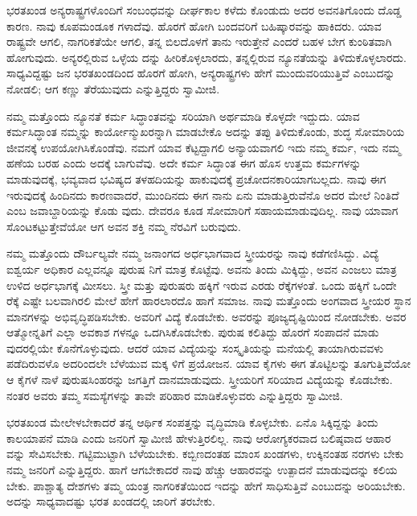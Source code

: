 ಭರತಖಂಡ ಅನ್ಯರಾಷ್ಟ್ರಗಳೊಂದಿಗೆ ಸಂಬಂಧವನ್ನು ದೀರ್ಘಕಾಲ ಕಳೆದು ಕೊಂಡುದು ಅದರ ಅವನತಿಗೊಂದು ದೊಡ್ಡ ಕಾರಣ. ನಾವು ಕೂಪಮಂಡೂಕ ಗಳಾದೆವು. ಹೊರಗೆ ಹೋಗಿ ಬಂದವರಿಗೆ ಬಹಿಷ್ಕಾರವನ್ನು ಹಾಕಿದರು. ಯಾವ ರಾಷ್ಟ್ರವೇ ಆಗಲಿ, ನಾಗರಿಕತೆಯೇ ಆಗಲಿ, ತನ್ನ ಬಿಲದೊಳಗೆ ತಾನು ಇರುತ್ತೇನೆ ಎಂದರೆ ಬಹಳ ಬೇಗ ಕುಂಠಿತವಾಗಿ ಹೋಗುವುದು. ಅನ್ಯರಲ್ಲಿರುವ ಒಳ್ಳೆಯ ದನ್ನು ಹೀರಿಕೊಳ್ಳಲಾರದು, ತನ್ನಲ್ಲಿರುವ ನ್ಯೂನತೆಯನ್ನು ತಿಳಿದುಕೊಳ್ಳಲಾರದು. ಸಾಧ್ಯವಿದ್ದಷ್ಟು ಜನ ಭರತಖಂಡದಿಂದ ಹೊರಗೆ ಹೋಗಿ, ಅನ್ಯರಾಷ್ಟ್ರಗಳು ಹೇಗೆ ಮುಂದುವರಿಯುತ್ತಿವೆ ಎಂಬುದನ್ನು ನೋಡಲಿ; ಆಗ ಕಣ್ಣು ತೆರೆಯುವುದು ಎನ್ನುತ್ತಿದ್ದರು ಸ್ವಾಮೀಜಿ.

ನಮ್ಮ ಮತ್ತೊಂದು ನ್ಯೂನತೆ ಕರ್ಮ ಸಿದ್ಧಾಂತವನ್ನು ಸರಿಯಾಗಿ ಅರ್ಥಮಾಡಿ ಕೊಳ್ಳದೇ ಇದ್ದುದು. ಯಾವ ಕರ್ಮಸಿದ್ಧಾಂತ ನಮ್ಮನ್ನು ಕಾರ್ಯೋನ್ಮುಖರನ್ನಾಗಿ ಮಾಡಬೇಕೊ ಅದನ್ನು ತಪ್ಪು ತಿಳಿದುಕೊಂಡು, ಶುದ್ಧ ಸೋಮಾರಿಯ ಜೀವನಕ್ಕೆ ಉಪಯೋಗಿಸಿಕೊಂಡೆವು. ನಮಗೆ ಯಾವ ಕೆಟ್ಟದ್ದಾಗಲಿ ಅನ್ಯಾಯವಾಗಲಿ ಇದು ನಮ್ಮ ಕರ್ಮ, ಇದು ನಮ್ಮ ಹಣೆಯ ಬರಹ ಎಂದು ಅದಕ್ಕೆ ಬಾಗುವೆವು. ಅದೇ ಕರ್ಮ ಸಿದ್ಧಾಂತ ಈಗ ಹೊಸ ಉತ್ತಮ ಕರ್ಮಗಳನ್ನು ಮಾಡುವುದಕ್ಕೆ, ಭವ್ಯವಾದ ಭವಿಷ್ಯದ ತಳಹದಿಯನ್ನು ಹಾಕುವುದಕ್ಕೆ ಪ್ರಚೋದನಕಾರಿಯಾಗಬಲ್ಲದು. ನಾವು ಈಗ ಇರುವುದಕ್ಕೆ ಹಿಂದಿನದು ಕಾರಣವಾದರೆ, ಮುಂದಿನದು ಈಗ ನಾನು ಏನು ಮಾಡುತ್ತಿರುವೆನೊ ಅದರ ಮೇಲೆ ನಿಂತಿದೆ ಎಂಬ ಜವಾಬ್ದಾರಿಯನ್ನು ಕೊಡು ವುದು. ದೇವರೂ ಕೂಡ ಸೋಮಾರಿಗೆ ಸಹಾಯಮಾಡುವುದಿಲ್ಲ. ನಾವು ಯಾವಾಗ ಸೊಂಟಕಟ್ಟುತ್ತೇವೆಯೋ ಆಗ ಅವನ ಶಕ್ತಿ ನಮ್ಮ ನೆರವಿಗೆ ಬರುವುದು.

ನಮ್ಮ ಮತ್ತೊಂದು ದೌರ್ಬಲ್ಯವೇ ನಮ್ಮ ಜನಾಂಗದ ಅರ್ಧಭಾಗವಾದ ಸ್ತ್ರೀಯರನ್ನು ನಾವು ಕಡೆಗಣಿಸಿದ್ದು. ವಿದ್ಯೆ ಐಶ್ವರ್ಯ ಅಧಿಕಾರ ಎಲ್ಲವನ್ನೂ ಪುರುಷ ನಿಗೆ ಮಾತ್ರ ಕೊಟ್ಟೆವು. ಅವನು ತಿಂದು ಮಿಕ್ಕಿದ್ದು, ಅವನ ಎಂಜಲು ಮಾತ್ರ ಉಳಿದ ಅರ್ಧಭಾಗಕ್ಕೆ ಮೀಸಲು. ಸ್ತ್ರೀ ಮತ್ತು ಪುರುಷರು ಹಕ್ಕಿಗೆ ಇರುವ ಎರಡು ರೆಕ್ಕೆಗಳಂತೆ. ಒಂದು ಹಕ್ಕಿಗೆ ಒಂದೇ ರೆಕ್ಕೆ ಎಷ್ಟೇ ಬಲವಾಗಿರಲಿ ಮೇಲೆ ಹೇಗೆ ಹಾರಲಾರದೊ ಹಾಗೆ ಸಮಾಜ. ನಾವು ಮತ್ತೊಂದು ಅಂಗವಾದ ಸ್ತ್ರೀಯರ ಸ್ಥಾನ ಮಾನಗಳನ್ನು ಅಭಿವೃದ್ಧಿಪಡಿಸಬೇಕು. ಅವರಿಗೆ ವಿದ್ಯೆ ಕೊಡಬೇಕು. ಅವರನ್ನು ಪೂಜ್ಯದೃಷ್ಟಿಯಿಂದ ನೋಡಬೇಕು. ಅವರ ಆತ್ಮೋನ್ನತಿಗೆ ಎಲ್ಲಾ ಅವಕಾಶ ಗಳನ್ನೂ ಒದಗಿಸಿಕೊಡಬೇಕು. ಪುರುಷ ಕಲಿತಿದ್ದು ಹೊರಗೆ ಸಂಪಾದನೆ ಮಾಡು ವುದರಲ್ಲಿಯೇ ಕೊನೆಗೊಳ್ಳುವುದು. ಆದರೆ ಯಾವ ವಿದ್ಯೆಯನ್ನು ಸಂಸ್ಕೃತಿಯನ್ನು ಮನೆಯಲ್ಲಿ ತಾಯಾಗಿರುವವಳು ಪಡೆದಿರುವಳೊ ಅದರಿಂದಲೇ ಬೆಳೆಯುವ ಮಕ್ಕ ಳಿಗೆ ಪ್ರಯೋಜನ. ಯಾವ ಕೈಗಳು ಈಗ ತೊಟ್ಟಿಲನ್ನು ತೂಗುತ್ತಿವೆಯೋ ಆ ಕೈಗಳೆ ನಾಳೆ ಪುರುಷಸಿಂಹರನ್ನು ಜಗತ್ತಿಗೆ ದಾನಮಾಡುವುದು. ಸ್ತ್ರೀಯರಿಗೆ ಸರಿಯಾದ ವಿದ್ಯೆಯನ್ನು ಕೊಡಬೇಕು. ನಂತರ ಅವರು ತಮ್ಮ ಸಮಸ್ಯೆಗಳನ್ನು ತಾವೇ ಪರಿಹಾರ ಮಾಡಿಕೊಳ್ಳುವರು ಎನ್ನುತ್ತಿದ್ದರು ಸ್ವಾಮೀಜಿ.

ಭರತಖಂಡ ಮೇಲೇಳಬೇಕಾದರೆ ತನ್ನ ಆರ್ಥಿಕ ಸಂಪತ್ತನ್ನು ವೃದ್ಧಿಮಾಡಿ ಕೊಳ್ಳಬೇಕು. ಏನೊ ಸಿಕ್ಕಿದ್ದನ್ನು ತಿಂದು ಕಾಲಯಾಪನೆ ಮಾಡಿ ಎಂದು ಜನರಿಗೆ ಸ್ವಾಮೀಜಿ ಹೇಳುತ್ತಿರಲಿಲ್ಲ. ನಾವು ಆರೋಗ್ಯಕರವಾದ ಬಲಿಷ್ಠವಾದ ಆಹಾರ ವನ್ನು ಸೇವಿಸಬೇಕು. ಗಟ್ಟಿಮುಟ್ಟಾಗಿ ಬೆಳೆಯಬೇಕು. ಕಬ್ಬಿಣದಂತಹ ಮಾಂಸ ಖಂಡಗಳು, ಉಕ್ಕಿನಂತಹ ನರಗಳು ಬೇಕು ನಮ್ಮ ಜನರಿಗೆ ಎನ್ನುತ್ತಿದ್ದರು. ಹಾಗೆ ಆಗಬೇಕಾದರೆ ನಾವು ಹೆಚ್ಚು ಆಹಾರವನ್ನು ಉತ್ಪಾದನೆ ಮಾಡುವುದನ್ನು ಕಲಿಯ ಬೇಕು. ಪಾಶ್ಚಾತ್ಯ ದೇಶಗಳು ತಮ್ಮ ಯಂತ್ರ ನಾಗರಿಕತೆಯಿಂದ ಇದನ್ನು ಹೇಗೆ ಸಾಧಿಸುತ್ತಿವೆ ಎಂಬುದನ್ನು ಅರಿಯಬೇಕು. ಅದನ್ನು ಸಾಧ್ಯವಾದಷ್ಟು ಭರತ ಖಂಡದಲ್ಲಿ ಜಾರಿಗೆ ತರಬೇಕು.

